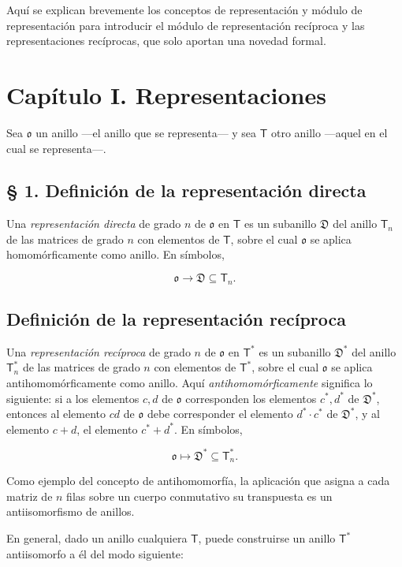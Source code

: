 Aquí se explican brevemente los conceptos de representación y módulo de representación para introducir el módulo de representación recíproca y las representaciones recíprocas, que solo aportan una novedad formal.

\section*{Capítulo I. Representaciones}

Sea $\mathfrak{o}$ un anillo ---el anillo que se representa--- y sea $\mathsf T$ otro anillo ---aquel en el cual se representa---.

\subsection*{§ 1. Definición de la representación directa}

Una \emph{representación directa} de grado $n$ de $\mathfrak{o}$ en $\mathsf T$ es un subanillo $\mathfrak D$ del anillo $\mathsf T_n$ de las matrices de grado $n$ con elementos de $\mathsf T$, sobre el cual $\mathfrak{o}$ se aplica homomórficamente como anillo. En símbolos,

\[
\mathfrak{o}\to\mathfrak D\subseteq\mathsf T_n.
\]

\subsection*{Definición de la representación recíproca}

Una \emph{representación recíproca} de grado $n$ de $\mathfrak{o}$ en $\mathsf T^*$ es un subanillo $\mathfrak D^*$ del anillo $\mathsf T_n^*$ de las matrices de grado $n$ con elementos de $\mathsf T^*$, sobre el cual $\mathfrak{o}$ se aplica antihomomórficamente como anillo. Aquí \emph{antihomomórficamente} significa lo siguiente: si a los elementos $c,d$ de $\mathfrak{o}$ corresponden los elementos $c^*,d^*$ de $\mathfrak D^*$, entonces al elemento $cd$ de $\mathfrak{o}$ debe corresponder el elemento $d^*\cdot c^*$ de $\mathfrak D^*$, y al elemento $c+d$, el elemento $c^*+d^*$. En símbolos,

\[
\mathfrak{o}\mapsto\mathfrak D^*\subseteq\mathsf T_n^*.
\]

Como ejemplo del concepto de antihomomorfía, la aplicación que asigna a cada matriz de $n$ filas sobre un cuerpo conmutativo su transpuesta es un antiisomorfismo de anillos.

En general, dado un anillo cualquiera $\mathsf T$, puede construirse un anillo $\mathsf T^*$ antiisomorfo a él del modo siguiente:

